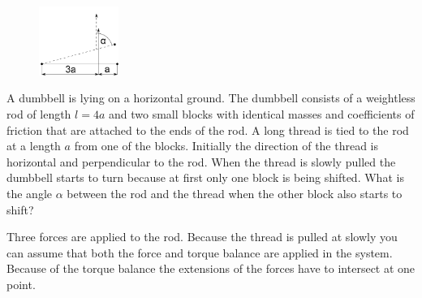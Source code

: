 {\ifEngStatement
\begin{figure}%
\vspace{-5 pt}%
\includegraphics[width=0.23\textwidth]{2015-v3g-09-hantel}%
\vspace{-15 pt}%
\end{figure}
A dumbbell is lying on a horizontal ground. The dumbbell consists of a weightless rod of length $l=4a$ and two small blocks with identical masses and coefficients of friction that are attached to the ends of the rod. A long thread is tied to the rod at a length $a$ from one of the blocks. Initially the direction of the thread is horizontal and perpendicular to the rod. When the thread is slowly pulled the dumbbell starts to turn because at first only one block is being shifted. What is the angle $\alpha$ between the rod and the thread when the other block also starts to shift?
\fi


\ifEngHint
Three forces are applied to the rod. Because the thread is pulled at slowly you can assume that both the force and torque balance are applied in the system. Because of the torque balance the extensions of the forces have to intersect at one point.
\fi


}
